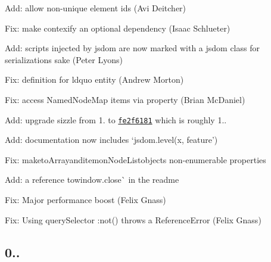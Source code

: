 \begin{DoxyItemize}
\item Add\+: allow non-\/unique element ids (Avi Deitcher)
\item Fix\+: make contexify an optional dependency (Isaac Schlueter)
\item Add\+: scripts injected by jsdom are now marked with a \textquotesingle{}jsdom\textquotesingle{} class for serialization\textquotesingle{}s sake (Peter Lyons)
\item Fix\+: definition for ldquo entity (Andrew Morton)
\item Fix\+: access Named\+Node\+Map items via property (Brian Mc\+Daniel)
\item Add\+: upgrade sizzle from 1. to \href{https://github.com/jquery/sizzle/commit/fe2f618106bb76857b229113d6d11653707d0b22}{\tt fe2f6181} which is roughly 1..
\item Add\+: documentation now includes `jsdom.\+level(x, \textquotesingle{}feature'){\ttfamily }
\item {\ttfamily Fix\+: make}to\+Array{\ttfamily and}item{\ttfamily on}Node\+List{\ttfamily objects non-\/enumerable properties}
\item {\ttfamily Add\+: a reference to}window.\+close\`{} in the readme
\item Fix\+: Major performance boost (Felix Gnass)
\item Fix\+: Using query\+Selector {\ttfamily \+:not()} throws a {\ttfamily Reference\+Error} (Felix Gnass)
\end{DoxyItemize}

\subsection*{0..}


